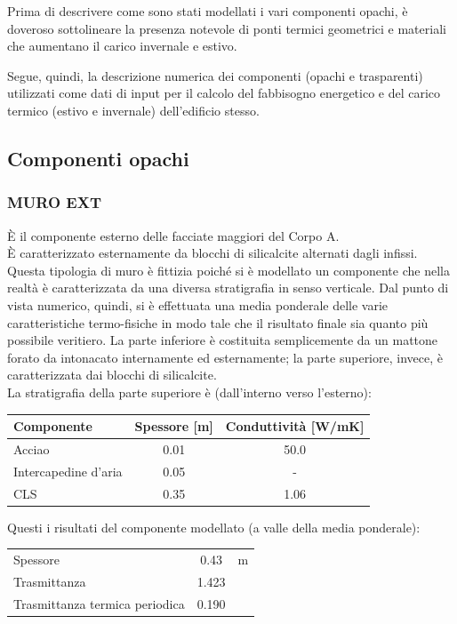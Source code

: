 Prima di descrivere come sono stati modellati i vari componenti opachi, è doveroso sottolineare la presenza notevole di ponti termici geometrici e materiali che aumentano il carico invernale e estivo.

Segue, quindi, la descrizione numerica dei componenti (opachi e trasparenti) utilizzati come dati di input per il calcolo del fabbisogno energetico e del carico termico (estivo e invernale) dell'edificio stesso.
\subsection{Componenti opachi}
\subsubsection{MURO EXT}
È il componente esterno delle facciate maggiori del Corpo A. \\È caratterizzato esternamente da blocchi di silicalcite alternati dagli infissi. \\Questa tipologia di muro è fittizia poiché si è modellato un componente che nella realtà è caratterizzata da una diversa stratigrafia in senso verticale. Dal punto di vista numerico, quindi, si è effettuata una media ponderale delle varie caratteristiche termo-fisiche in modo tale che il risultato finale sia quanto più possibile veritiero. La parte inferiore è costituita semplicemente da un mattone forato da  intonacato internamente ed esternamente; la parte superiore, invece, è caratterizzata dai blocchi di silicalcite. \\ La stratigrafia della parte superiore è (dall'interno verso l'esterno):
\begin{center}
	\begin{tabular}{lcc}
		\toprule
		Componente & Spessore [m] & Conduttività [\si{W/mK}] \\
		\midrule
		Acciao & \num{0.01} & \num{50.0} \\
		Intercapedine d'aria & \num{0.05} & -\\
		CLS & \num{0.35} & \num{1.06} \\
		\bottomrule
	\end{tabular}
\end{center}
Questi i risultati del componente modellato (a valle della media ponderale):
\begin{center}
	\begin{tabular}{lcc}
		\toprule
		Spessore & \num{0.43} & \si{m}\\
		Trasmittanza & \num{1.423} & \trasm\\
		Trasmittanza termica periodica & \num{0.190} & \trasm\\
		\bottomrule
	\end{tabular}
\end{center}
